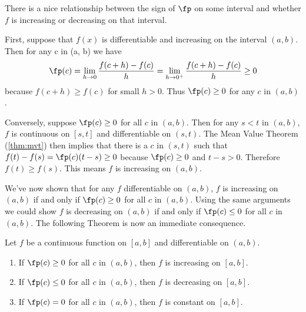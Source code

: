 There is a nice relationship between the sign of $\fp$ on some interval and whether $f$ is increasing or decreasing on that interval.

First, suppose that $f(x)$ is differentiable and increasing on the interval $(a,b)$. Then for any c in (a, b) we have
\[\fp(c)=\lim_{h\to0}\frac{f(c+h)-f(c)}h=\lim_{h\to0^+}\frac{f(c+h)-f(c)}h\ge0\]
because $f(c+h)\ge f(c)$ for small $h>0$. Thus $\fp(c)\ge0$ for any $c$ in $(a,b)$.

Conversely, suppose $\fp(c)\ge0$ for all $c$ in $(a,b)$. Then for any $s<t$ in $(a,b)$, $f$ is continuous on $[s,t]$ and differentiable on $(s,t)$. The Mean Value Theorem (\autoref{thm:mvt}) then implies that there is a $c$ in $(s,t)$ such that
$f(t)-f(s)=\fp(c)(t-s)\ge0$
because $\fp(c)\ge0$ and $t-s>0$. Therefore $f(t)\ge f(s)$. This means $f$ is increasing on $(a,b)$.

We've now shown that for any $f$ differentiable on $(a,b)$,
$f$ is increasing on $(a,b)$ if and only if $\fp(c)\ge0$ for all $c$ in $(a,b)$.
Using the same arguments we could show $f$ is decreasing on $(a,b)$ if and only if $\fp(c)\le0$ for all $c$ in $(a,b)$. The following Theorem is now an immediate consequence.


\begin{theorem}\label{thm:incr_decr}
Let $f$ be a continuous function on $[a,b]$ and differentiable on $(a,b)$.
\begin{enumerate}
\item	If $\fp(c) \ge 0$ for all $c$ in $(a,b)$, then $f$ is increasing on $[a,b]$.
\item	If $\fp(c) \le 0$ for all $c$ in $(a,b)$, then $f$ is decreasing on $[a,b]$.
\item	If $\fp(c) =0$ for all $c$ in $(a,b)$, then $f$ is constant on $[a,b]$.
\end{enumerate}
\end{theorem}


